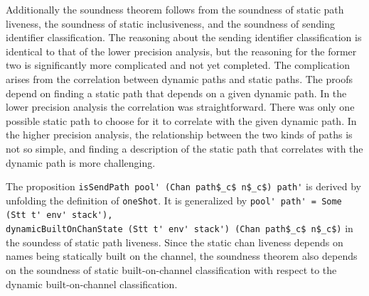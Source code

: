 \documentclass[letterpaper, 11pt]{report}
\begin{document}
Additionally the soundness theorem follows from the soundness of static path liveness,
the soundness of static inclusiveness, and the soundness of sending identifier classification. 
The reasoning about the sending identifier classification is identical to that of the lower precision analysis,
but the reasoning for the former two is significantly more complicated and not yet completed.
The complication arises from the correlation between dynamic paths and static paths.
The proofs depend on finding a static path that depends on a given dynamic path.
In the lower precision analysis the correlation was straightforward.
There was only one possible static path to choose for it
to correlate with the given dynamic path. In the higher precision analysis, the relationship
between the two kinds of paths is not so simple, and finding a description of the static path
that correlates with the dynamic path is more challenging.

The proposition \lstinline[mathescape]{isSendPath pool' (Chan path$_c$ n$_c$) path'} is derived
by unfolding the definition of \lstinline{oneShot}.
It is generalized by \lstinline[mathescape]{pool' path' = Some (Stt t' env' stack'),}\\
\lstinline[mathescape]{dynamicBuiltOnChanState (Stt t' env' stack') (Chan path$_c$ n$_c$)} in the soundess of
static path liveness. Since the static chan liveness depends on names being statically built on the channel,
the soundness theorem also depends on the soundness of static built-on-channel classification with respect
to the dynamic built-on-channel classification.
\end{document}

